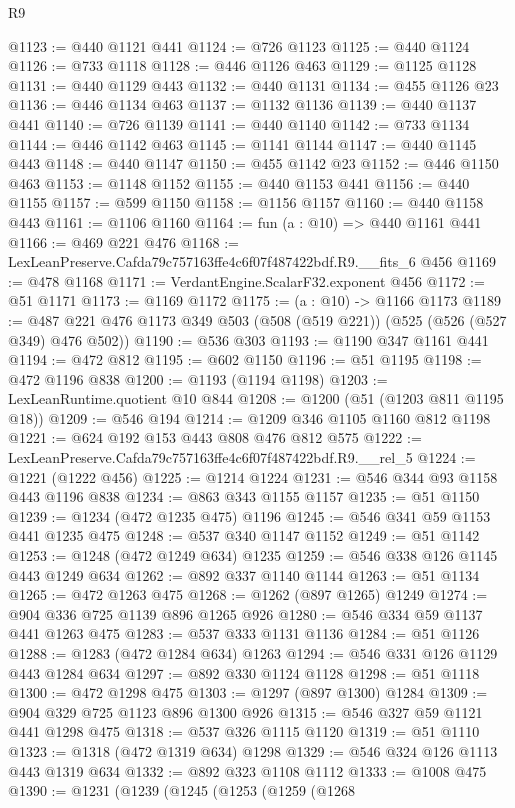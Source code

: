 \begin{lexlean}{R9}
\begin{coremodule}
@1123 := @440 @1121 @441
@1124 := @726 @1123
@1125 := @440 @1124
@1126 := @733 @1118
@1128 := @446 @1126 @463
@1129 := @1125 @1128
@1131 := @440 @1129 @443
@1132 := @440 @1131
@1134 := @455 @1126 @23
@1136 := @446 @1134 @463
@1137 := @1132 @1136
@1139 := @440 @1137 @441
@1140 := @726 @1139
@1141 := @440 @1140
@1142 := @733 @1134
@1144 := @446 @1142 @463
@1145 := @1141 @1144
@1147 := @440 @1145 @443
@1148 := @440 @1147
@1150 := @455 @1142 @23
@1152 := @446 @1150 @463
@1153 := @1148 @1152
@1155 := @440 @1153 @441
@1156 := @440 @1155
@1157 := @599 @1150
@1158 := @1156 @1157
@1160 := @440 @1158 @443
@1161 := @1106 @1160
@1164 := fun (a : @10) => @440 @1161 @441
@1166 := @469 @221 @476
@1168 := LexLeanPreserve.Cafda79c757163ffe4c6f07f487422bdf.R9.__fits_6 @456
@1169 := @478 @1168
@1171 := VerdantEngine.ScalarF32.exponent @456
@1172 := @51 @1171
@1173 := @1169 @1172
@1175 := (a : @10) -> @1166 @1173
@1189 := @487 @221 @476 @1173 @349 @503 (@508 (@519 @221)) (@525 (@526 (@527 @349) @476 @502))
@1190 := @536 @303
@1193 := @1190 @347 @1161 @441
@1194 := @472 @812
@1195 := @602 @1150
@1196 := @51 @1195
@1198 := @472 @1196 @838
@1200 := @1193 (@1194 @1198)
@1203 := LexLeanRuntime.quotient @10 @844
@1208 := @1200 (@51 (@1203 @811 @1195 @18))
@1209 := @546 @194
@1214 := @1209 @346 @1105 @1160 @812 @1198
@1221 := @624 @192 @153 @443 @808 @476 @812 @575
@1222 := LexLeanPreserve.Cafda79c757163ffe4c6f07f487422bdf.R9.__rel_5
@1224 := @1221 (@1222 @456)
@1225 := @1214 @1224
@1231 := @546 @344 @93 @1158 @443 @1196 @838
@1234 := @863 @343 @1155 @1157
@1235 := @51 @1150
@1239 := @1234 (@472 @1235 @475) @1196
@1245 := @546 @341 @59 @1153 @441 @1235 @475
@1248 := @537 @340 @1147 @1152
@1249 := @51 @1142
@1253 := @1248 (@472 @1249 @634) @1235
@1259 := @546 @338 @126 @1145 @443 @1249 @634
@1262 := @892 @337 @1140 @1144
@1263 := @51 @1134
@1265 := @472 @1263 @475
@1268 := @1262 (@897 @1265) @1249
@1274 := @904 @336 @725 @1139 @896 @1265 @926
@1280 := @546 @334 @59 @1137 @441 @1263 @475
@1283 := @537 @333 @1131 @1136
@1284 := @51 @1126
@1288 := @1283 (@472 @1284 @634) @1263
@1294 := @546 @331 @126 @1129 @443 @1284 @634
@1297 := @892 @330 @1124 @1128
@1298 := @51 @1118
@1300 := @472 @1298 @475
@1303 := @1297 (@897 @1300) @1284
@1309 := @904 @329 @725 @1123 @896 @1300 @926
@1315 := @546 @327 @59 @1121 @441 @1298 @475
@1318 := @537 @326 @1115 @1120
@1319 := @51 @1110
@1323 := @1318 (@472 @1319 @634) @1298
@1329 := @546 @324 @126 @1113 @443 @1319 @634
@1332 := @892 @323 @1108 @1112
@1333 := @1008 @475
@1390 := @1231
    (@1239
      (@1245
        (@1253
          (@1259
            (@1268

\end{coremodule}
\end{lexlean}
